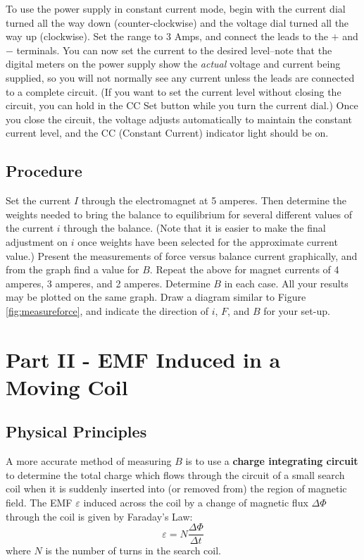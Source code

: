 To use the power supply in constant current mode, begin with the current dial turned all the way down (counter-clockwise) and the voltage dial turned all the way up (clockwise). Set the range to 3 Amps, and connect the leads to the $+$ and $-$ terminals. You can now set the current to the desired level--note that the digital meters on the power supply show the \emph{actual} voltage and current being supplied, so you will not normally see any current unless the leads are connected to a complete circuit. (If you want to set the current level without closing the circuit, you can hold in the CC Set button while you turn the current dial.) Once you close the circuit, the voltage adjusts automatically to maintain the constant current level, and the CC (Constant Current) indicator light should be on.

\subsection{Procedure}
Set the current $I$ through the electromagnet at 5 amperes. Then determine the weights needed to bring the balance to equilibrium for several different values of the current $i$ through the balance. (Note that it is easier to make the final adjustment on $i$ once weights have been selected for the approximate current value.) Present the measurements of force versus balance current graphically, and from the graph find a value for $B$. Repeat the above for magnet currents of 4 amperes, 3 amperes, and 2 amperes. Determine $B$ in each case. All your results may be plotted on the same graph. Draw a diagram similar to Figure {\ref{fig:measureforce}}, and indicate the direction of $i$, $F$, and $B$ for your set-up. 

\section{Part II - EMF Induced in a Moving Coil}
\subsection{Physical Principles}
A more accurate method of measuring $B$ is to use a \textbf{charge integrating circuit} to determine the total charge which flows through the circuit of a small search coil when it is suddenly inserted into (or removed from) the region of magnetic field. The EMF $\varepsilon$  induced across the coil by a change of magnetic flux $\Delta\Phi$ through the coil is given by Faraday's Law:
\begin{equation}
  \varepsilon=N\frac{\Delta \Phi}{\Delta t}
\end{equation}
where $N$ is the number of turns in the search coil.\myskip

